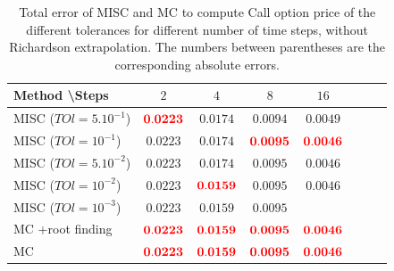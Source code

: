 \documentclass[11pt]{article}
\begin{document}
\begin{table}[h!]
	\centering
	\begin{tabular}{l*{6}{c}r}
		Method \textbackslash  Steps            & $2$ & $4$ & $8$ & $16$  \\
		\hline
		MISC ($TOl=5.10^{-1}$)  &  $\mathbf{{\color{red}0.0223}}$ & $\mathbf{0.0174}$ & $\mathbf{0.0094}$ & $\mathbf{0.0049}$  \\
		MISC ($TOl=10^{-1}$)  &  $\mathbf{0.0223}$& $\mathbf{0.0174}$ & $\mathbf{{\color{red}0.0095}}$ & $\mathbf{{\color{red}0.0046}}$  \\
		MISC ($TOl=5.10^{-2}$) & $\mathbf{0.0223}$ & $\mathbf{0.0174}$ &  $\mathbf{0.0095}$ & $\mathbf{0.0046}$  \\
		MISC ($TOl=10^{-2}$)  &  $\mathbf{0.0223}$& $\mathbf{{\color{red}0.0159}}$ & $\mathbf{0.0095}$ &  $\mathbf{0.0046}$  \\
		MISC ($TOl=10^{-3}$) &  $\mathbf{0.0223}$ & $\mathbf{0.0159}$ & $\mathbf{0.0095}$ & $\mathbf{}$  \\
		
		\hline
		
			MC +root finding  &  $\mathbf{{\color{red}0.0223}}$ & $\mathbf{{\color{red}0.0159}}$ & $\mathbf{{\color{red}0.0095}}$ & $\mathbf{{\color{red}0.0046}}$  \\	
				MC   &  $\mathbf{{\color{red}0.0223}}$ & $\mathbf{{\color{red}0.0159}}$ & $\mathbf{{\color{red}0.0095}}$ & $\mathbf{{\color{red}0.0046}}$  \\	
		\hline
	\end{tabular}
	\caption{Total error of MISC and MC to compute Call option price of the different tolerances for different number of time steps, without Richardson extrapolation. The numbers between parentheses are the corresponding absolute errors.}
	\label{Total error of MISC and MC to compute Call option price of the different tolerances for different number of time steps, without Richardson extrapolation. The numbers between parentheses are the corresponding absolute errors.}
\end{table}
\end{document}
